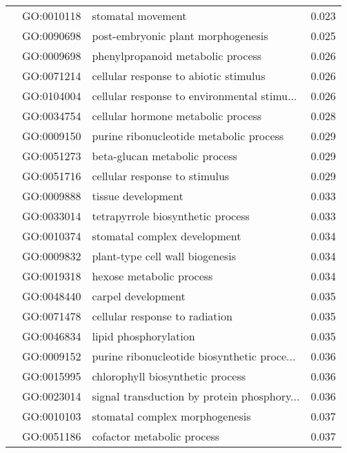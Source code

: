 \begin{longtable}{lllr}
   & GO:0010118 &                            stomatal movement &         0.023 \\
   & GO:0090698 &           post-embryonic plant morphogenesis &         0.025 \\
   & GO:0009698 &            phenylpropanoid metabolic process &         0.026 \\
   & GO:0071214 &        cellular response to abiotic stimulus &         0.026 \\
   & GO:0104004 &  cellular response to environmental stimu... &         0.026 \\
   & GO:0034754 &           cellular hormone metabolic process &         0.028 \\
   & GO:0009150 &      purine ribonucleotide metabolic process &         0.029 \\
   & GO:0051273 &                beta-glucan metabolic process &         0.029 \\
   & GO:0051716 &                cellular response to stimulus &         0.029 \\
   & GO:0009888 &                           tissue development &         0.033 \\
   & GO:0033014 &            tetrapyrrole biosynthetic process &         0.033 \\
   & GO:0010374 &                 stomatal complex development &         0.034 \\
   & GO:0009832 &              plant-type cell wall biogenesis &         0.034 \\
   & GO:0019318 &                     hexose metabolic process &         0.034 \\
   & GO:0048440 &                           carpel development &         0.035 \\
   & GO:0071478 &               cellular response to radiation &         0.035 \\
   & GO:0046834 &                        lipid phosphorylation &         0.035 \\
   & GO:0009152 &  purine ribonucleotide biosynthetic proce... &         0.036 \\
   & GO:0015995 &             chlorophyll biosynthetic process &         0.036 \\
   & GO:0023014 &  signal transduction by protein phosphory... &         0.036 \\
   & GO:0010103 &               stomatal complex morphogenesis &         0.037 \\
   & GO:0051186 &                   cofactor metabolic process &         0.037 \\

\end{longtable}
